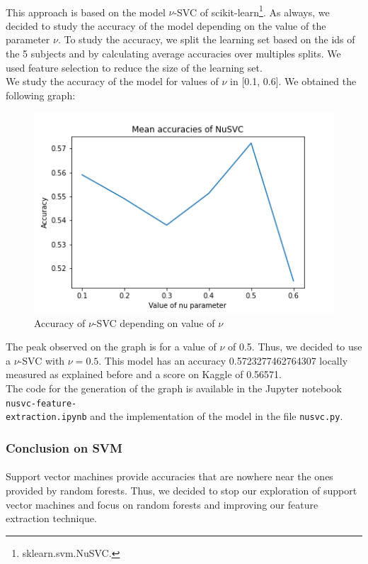 \documentclass[a4paper, 11pt, oneside]{article}
\begin{document}
\paragraph{}This approach is based on the model $\nu$-SVC of scikit-learn\footnote{sklearn.svm.NuSVC.}. As always, we decided to study the accuracy of the model depending on the value of the parameter $\nu$. To study the accuracy, we split the learning set based on the ids of the 5 subjects and by calculating average accuracies over multiples splits. We used feature selection to reduce the size of the learning set.\\
We study the accuracy of the model for values of $\nu$ in [0.1, 0.6]. We obtained the following graph:
\begin{figure}[H]
\centering
\includegraphics[scale=0.4]{nusvm/svm_nu_svc_accuracies_1.png}
\caption{Accuracy of $\nu$-SVC depending on value of $\nu$}
\end{figure}
The peak observed on the graph is for a value of $\nu$ of 0.5. Thus, we decided to use a $\nu$-SVC with $\nu = 0.5$. This model has an accuracy 0.5723277462764307 locally measured as explained before and a score on Kaggle of 0.56571.\\
The code for the generation of the graph is available in the Jupyter notebook \texttt{nusvc-feature-\\extraction.ipynb} and the implementation of the model in the file \texttt{nusvc.py}.

\subsubsection{Conclusion on SVM}
\paragraph{}Support vector machines provide accuracies that are nowhere near the ones provided by random forests. Thus, we decided to stop our exploration of support vector machines and focus on random forests and improving our feature extraction technique.
\end{document}
